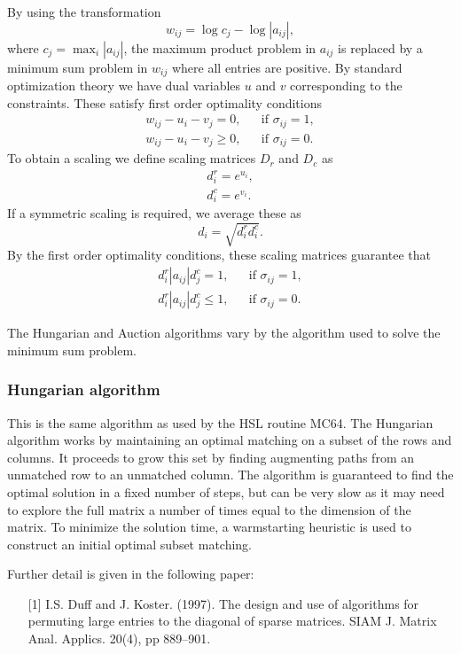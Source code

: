 By using the transformation
$$
   w_{ij} = \log c_j - \log |a_{ij}|,
$$
where $c_j = \max_i |a_{ij}|$, the maximum product problem in $a_{ij}$ is
replaced by a minimum sum problem in $w_{ij}$ where all entries are positive.
By standard optimization theory we have dual variables $u$ and $v$ corresponding
to the constraints. These satisfy first order optimality conditions
\begin{eqnarray*}
   w_{ij} - u_i - v_j = 0, && \mbox{if } \sigma_{ij }=1, \\
   w_{ij} - u_i - v_j \ge 0, && \mbox{if } \sigma_{ij }=0.
\end{eqnarray*}
To obtain a scaling we define scaling matrices $D_r$ and $D_c$ as
\begin{eqnarray*}
   & d^r_i = e^{u_i}, & \\
   & d^c_i = e^{v_i}. &
\end{eqnarray*}
If a symmetric scaling is required, we average these as
$$
   d_i = \sqrt{d^r_id^c_i}.
$$
By the first order optimality conditions, these scaling matrices guarantee that
\begin{eqnarray*}
   d^r_i|a_{ij}|d^c_j = 1, && \mbox{if } \sigma_{ij}=1, \\
   d^r_i|a_{ij}|d^c_j \le 1, && \mbox{if } \sigma_{ij}=0.
\end{eqnarray*}

The Hungarian and Auction algorithms vary by the algorithm used to solve the
minimum sum problem.

\subsubsection{Hungarian algorithm}
This is the same algorithm as used by the HSL routine MC64.
The Hungarian algorithm works by maintaining an optimal matching on a subset of
the rows and columns. It proceeds to grow this set by finding augmenting paths
from an unmatched row to an unmatched column. The algorithm is guaranteed to
find the optimal solution in a fixed number of steps, but can be very slow as
it may need to explore the full matrix a number of times equal to the dimension
of the matrix. To minimize the solution time, a warmstarting heuristic is used
to construct an initial optimal subset matching.

\noindent
Further detail is given in the following paper:
\begin{itemize}
   \item[{[1]}] I.S. Duff and J. Koster. (1997). The design and use of algorithms for permuting large entries to the diagonal of sparse matrices. SIAM J. Matrix Anal. Applics. 20(4), pp 889--901.
\end{itemize}


